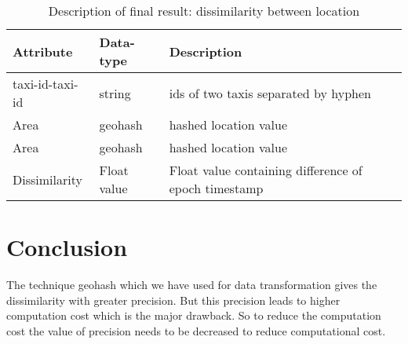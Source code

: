 \documentclass[paper=letter, fontsize=12pt]{article}
\begin{document}
\begin{table}[H]
	\centering
	\renewcommand{\arraystretch}{1.5}
	\begin{tabular}{l | l | l}
		Attribute & Data-type & Description
		\\ \hline \hline
		taxi-id-taxi-id & string & ids of two taxis separated by hyphen
		\\ \hline
		Area & geohash & hashed location value
		\\ \hline
		Area & geohash & hashed location value
		\\ \hline
		Dissimilarity & Float value & Float value containing difference of epoch timestamp
	\end{tabular}
	\caption{Description of final result: dissimilarity between location}
\end{table}

\section{Conclusion}
The technique geohash which we have used for data transformation gives the dissimilarity with
greater precision. But this precision leads to higher computation cost which is the major drawback.
So to reduce the computation cost the value of precision needs to be decreased to reduce
computational cost.
\end{document}
